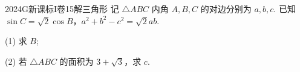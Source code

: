 
\begin{problem}{2024}{G}{新课标I卷}{15}{解三角形}
记 $\triangle ABC$ 内角 $A,B,C$ 的对边分别为 $a,b,c$. 已知 $\sin C=\sqrt{2}\cos B$，$a^2+b^2-c^2=\sqrt{2}ab$.

(1) 求 $B$;

(2) 若 $\triangle ABC$ 的面积为 $3+\sqrt{3}$，求 $c$.
\end{problem}